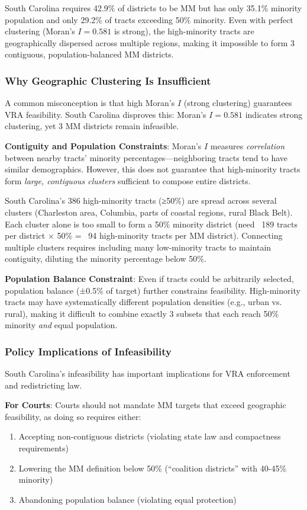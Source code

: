 South Carolina requires 42.9\% of districts to be MM but has only 35.1\% minority population and only 29.2\% of tracts exceeding 50\% minority. Even with perfect clustering (Moran's $I = 0.581$ is strong), the high-minority tracts are geographically dispersed across multiple regions, making it impossible to form 3 contiguous, population-balanced MM districts.

\subsubsection{Why Geographic Clustering Is Insufficient}

A common misconception is that high Moran's $I$ (strong clustering) guarantees VRA feasibility. South Carolina disproves this: Moran's $I = 0.581$ indicates strong clustering, yet 3 MM districts remain infeasible.

\textbf{Contiguity and Population Constraints}: Moran's $I$ measures \emph{correlation} between nearby tracts' minority percentages---neighboring tracts tend to have similar demographics. However, this does not guarantee that high-minority tracts form \emph{large, contiguous clusters} sufficient to compose entire districts.

South Carolina's 386 high-minority tracts (≥50\%) are spread across several clusters (Charleston area, Columbia, parts of coastal regions, rural Black Belt). Each cluster alone is too small to form a 50\% minority district (need ~189 tracts per district × 50\% = ~94 high-minority tracts per MM district). Connecting multiple clusters requires including many low-minority tracts to maintain contiguity, diluting the minority percentage below 50\%.

\textbf{Population Balance Constraint}: Even if tracts could be arbitrarily selected, population balance (±0.5\% of target) further constrains feasibility. High-minority tracts may have systematically different population densities (e.g., urban vs. rural), making it difficult to combine exactly 3 subsets that each reach 50\% minority \emph{and} equal population.

\subsubsection{Policy Implications of Infeasibility}

South Carolina's infeasibility has important implications for VRA enforcement and redistricting law.

\textbf{For Courts}: Courts should not mandate MM targets that exceed geographic feasibility, as doing so requires either:
\begin{enumerate}
    \item Accepting non-contiguous districts (violating state law and compactness requirements)
    \item Lowering the MM definition below 50\% (``coalition districts'' with 40-45\% minority)
    \item Abandoning population balance (violating equal protection)
\end{enumerate}

